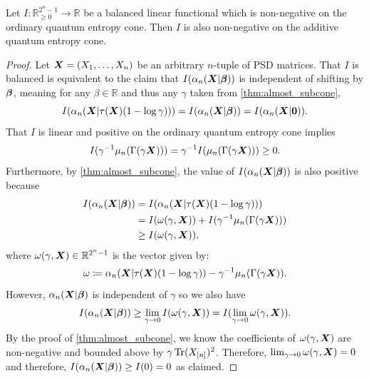 \documentclass[notitlepage, 10pt]{article}
\begin{document}
\begin{cor}
    \label{cor:balanced_ineqs}
    Let $I : \mathbb R^{2^n-1}_{\geq 0} \to \mathbb R$ be a balanced linear functional which is non-negative on the ordinary quantum entropy cone.
    Then $I$ is also non-negative on the additive quantum entropy cone.
\end{cor}
\begin{proof}
    Let $\boldsymbol{X} = (X_1, \ldots, X_n)$ be an arbitrary $n$-tuple of PSD matrices.
    That $I$ is balanced is equivalent to the claim that $I(\alpha_n(\boldsymbol{X}|\boldsymbol{\beta}))$ is independent of shifting by $\boldsymbol{\beta}$, meaning for any $\beta \in \mathbb R$ and thus any $\gamma$ taken from \cref{thm:almost_subcone},
    \begin{equation}
        I(\alpha_n(\boldsymbol{X}|\tau(\boldsymbol{X})(1-\log \gamma))) = I(\alpha_n(\boldsymbol{X}|\boldsymbol{\beta})) = I(\alpha_n(\boldsymbol{X}|\boldsymbol{0})).
    \end{equation}
    That $I$ is linear and positive on the ordinary quantum entropy cone implies
    \begin{equation}
        I(\gamma^{-1}\mu_n(\Gamma(\gamma\boldsymbol{ X}))) = \gamma^{-1}I(\mu_n(\Gamma(\gamma\boldsymbol{ X}))) \geq 0.
    \end{equation}
    Furthermore, by \cref{thm:almost_subcone}, the value of $I(\alpha_n(\boldsymbol{X}|\boldsymbol{\beta}))$ is also positive because
    \begin{align}
        I(\alpha_n(\boldsymbol{X}|\boldsymbol{\beta})) 
        &= I(\alpha_n(\boldsymbol{X}|\tau(\boldsymbol{X})(1-\log \gamma))) \\
        &= I(\omega(\gamma,\boldsymbol{X})) + I(\gamma^{-1}\mu_n(\Gamma(\gamma\boldsymbol{ X})))\\
        &\geq I(\omega(\gamma,\boldsymbol{X})),
    \end{align}
    where $\omega(\gamma, \boldsymbol{X}) \in \mathbb R^{2^n-1}$ is the vector given by:
    \begin{equation}
        \omega \coloneqq \alpha_n(\boldsymbol{X}|\tau(\boldsymbol{X})(1-\log \gamma)) - \gamma^{-1}\mu_n(\Gamma(\gamma\boldsymbol{ X})).
    \end{equation}
    However, $\alpha_n(\boldsymbol{X}|\boldsymbol{\beta})$ is independent of $\gamma$ so we also have
    \begin{equation}
        I(\alpha_n(\boldsymbol{X}|\boldsymbol{\beta}))
        \geq \lim_{\gamma \to 0} I(\omega(\gamma,\boldsymbol{X}))
        = I( \lim_{\gamma \to 0}\omega(\gamma,\boldsymbol{X})).
    \end{equation}
    By the proof of \cref{thm:almost_subcone}, we know the coefficients of $\omega(\gamma,\boldsymbol{X})$ are non-negative and bounded above by $\gamma \operatorname{Tr}(X_{[n]})^2$. Therefore, $\lim_{\gamma \to 0}\omega(\gamma,\boldsymbol{X}) = 0$ and therefore, $I(\alpha_n(\boldsymbol{X}|\boldsymbol{\beta})) \geq I(0) = 0$ as claimed.
\end{proof}
\end{document}
